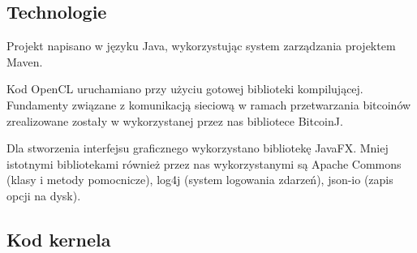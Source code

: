 \documentclass[11pt,a4paper]{article}
\begin{document}
\subsection{Technologie}

Projekt napisano w języku Java, wykorzystując system zarządzania projektem Maven.

Kod OpenCL uruchamiano przy użyciu gotowej biblioteki kompilującej.
Fundamenty związane z komunikacją sieciową w ramach przetwarzania bitcoinów zrealizowane zostały w wykorzystanej przez nas bibliotece BitcoinJ.

Dla stworzenia interfejsu graficznego wykorzystano bibliotekę JavaFX.
Mniej istotnymi bibliotekami również przez nas wykorzystanymi są Apache Commons (klasy i metody pomocnicze), log4j (system logowania zdarzeń),  json-io (zapis opcji na dysk).

\subsection{Kod kernela}
\end{document}
